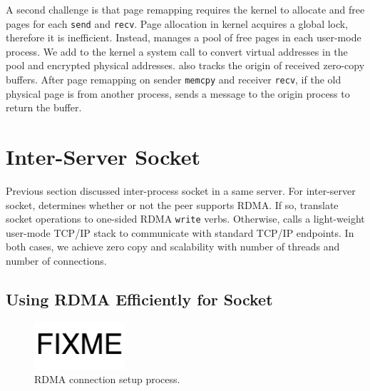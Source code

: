 A second challenge is that page remapping requires the kernel to allocate and free pages for each \texttt{send} and \texttt{recv}. Page allocation in kernel acquires a global lock, therefore it is inefficient. Instead, \libipc{} manages a pool of free pages in each user-mode process.
We add to the kernel a system call to convert virtual addresses in the pool and encrypted physical addresses.
\libipc{} also tracks the origin of received zero-copy buffers.
After page remapping on sender \texttt{memcpy} and receiver \texttt{recv}, if the old physical page is from another process, \libipc{} sends a message to the origin process to return the buffer.


\section{Inter-Server Socket}
\label{sec:inter-server}

Previous section discussed inter-process socket in a same server. For inter-server socket, \libipc{} determines whether or not the peer supports RDMA. If so, \libipc{} translate socket operations to one-sided RDMA \texttt{write} verbs. Otherwise, \libipc{} calls a light-weight user-mode TCP/IP stack to communicate with standard TCP/IP endpoints. In both cases, we achieve zero copy and scalability with number of threads and number of connections.

\subsection{Using RDMA Efficiently for Socket}
\label{subsec:rdma}

\begin{figure}[t]
	\centering
	\includegraphics[width=0.3\textwidth]{images/fixme}
	\caption{RDMA connection setup process.}
	\label{fig:rdma}
\end{figure}

